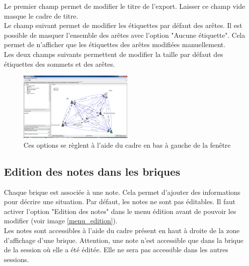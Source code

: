 Le premier champ permet de modifier le titre de l'export. Laisser ce champ vide masque le cadre de titre.\\

Le champ suivant permet de modifier les étiquettes par défaut des arêtes. Il est possible de masquer l'ensemble des arêtes avec l'option "Aucune étiquette". Cela permet de n'afficher que les étiquettes des arêtes modifiées manuellement.\\

Les deux champs suivants permettent de modifier la taille par défaut des étiquettes des sommets et des arêtes.\\

\begin{figure}[h!]
\centering
\includegraphics[width=0.5\textwidth]{../images/export_global.png}
\caption{Ces options se règlent à l'aide du cadre en bas à gauche de la fenêtre}
\end{figure}


\subsection{Edition des notes dans les briques}
Chaque brique est associée à une note. Cela permet d'ajouter des informations pour décrire une situation. Par défaut, les notes ne sont pas éditables. Il faut activer l'option "Edition des notes" dans le menu édition avant de pouvoir les modifier (voir image \ref{menu_edition}).\\

Les notes sont accessibles à l'aide du cadre présent en haut à droite de la zone d'affichage d'une brique. Attention, une note n'est accessible que dans la brique de la session où elle a été éditée. Elle ne sera pas accessible dans les autres sessions.\\

